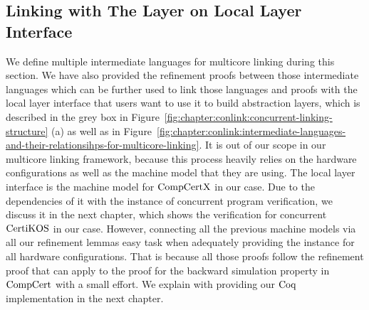 
\subsection{Linking with The Layer on Local Layer Interface}
\label{chapter:linking:subsec:linking-with-the-layer-on-local-layer-interface}


We define multiple intermediate languages for multicore linking during this section.
We have also provided the refinement proofs between those intermediate languages which can be further used to link those languages and proofs with the local layer interface that users want to use 
it to build abstraction layers, which is described in the grey box in Figure~\ref{fig:chapter:conlink:concurrent-linking-structure} (a) as well as in Figure~\ref{fig:chapter:conlink:intermediate-languages-and-their-relationsihps-for-multicore-linking}.
It is out of our scope in our multicore linking framework,
because this process heavily relies on the hardware configurations as well as the machine model that they are using. 
The local layer interface is the machine model for $\mathrm{CompCertX}$ in our case. 
Due to the dependencies of it with the instance of concurrent program verification, 
we discuss it in the next chapter, which shows the verification for concurrent $\mathrm{CertiKOS}$ in our case. 
However, connecting all the previous machine models via
all our refinement lemmas 
easy task when adequately providing the instance for all hardware configurations.
That is because all those proofs follow the refinement proof that can apply to the proof for the backward simulation property in $\mathrm{CompCert}$ with a small effort. 
We explain with providing our $\mathrm{Coq}$ implementation in the next chapter.
